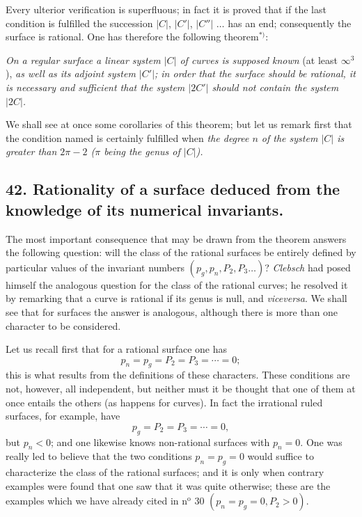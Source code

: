 \documentclass{article}
\begin{document}
Every ulterior verification is superfluous; in fact it is proved that if the last condition is fulfilled the succession $|C|$, $|C'|$, $|C''|$ $\ldots$ has an end; consequently the surface is rational. One has therefore the following theorem${}^{*)}$:

\emph{On a regular surface a linear system $|C|$ of curves is supposed known} (at least $\infty^{3}$), \emph{as well as its adjoint system $|C'|$; in order that the surface should be rational, it is necessary and sufficient that the system $|2C'|$ should not contain the system $|2C|$.}

We shall see at once some corollaries of this theorem; but let us remark first that the condition named is certainly fulfilled when \emph{the degree $n$ of the system $|C|$ is greater than $2\pi - 2$ ($\pi$ being the genus of $|C|$).}

\subsection*{42. Rationality of a surface deduced from the knowledge of its numerical invariants.}

The most important consequence that may be drawn from the theorem answers the following question: will the class of the rational surfaces be entirely defined by particular values of the invariant numbers $(p_{g}, p_{n}, P_{2}, P_{3} \ldots)$? \emph{Clebsch} had posed himself the analogous question for the class of the rational curves; he resolved it by remarking that a curve is rational if its genus is null, and \emph{viceversa}. We shall see that for surfaces the answer is analogous, although there is more than one character to be considered.

Let us recall first that for a rational surface one has
\[ p_{n} = p_{g} = P_{2} = P_{3} = \cdots = 0; \]
this is what results from the definitions of these characters. These conditions are not, however, all independent, but neither must it be thought that one of them at once entails the others (as happens for curves). In fact the irrational ruled surfaces, for example, have
\[ p_{g} = P_{2} = P_{3} = \cdots = 0, \]
but $p_{n} < 0$; and one likewise knows non-rational surfaces with $p_{n} = 0$. One was really led to believe that the two conditions $p_{n} = p_{g} = 0$ would suffice to characterize the class of the rational surfaces; and it is only when contrary examples were found that one saw that it was quite otherwise; these are the examples which we have already cited in n${}^{\text{o}}$ 30 $(p_{n} = p_{g} = 0, P_{2} > 0)$.
\end{document}
